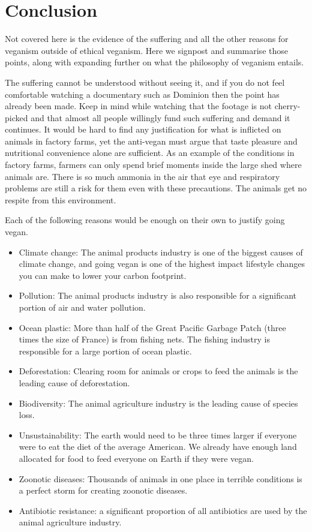 
\section{Conclusion}

Not covered here is the evidence of the suffering and all the other reasons for veganism outside of ethical veganism. Here we signpost and summarise those points, along with expanding further on what the philosophy of veganism entails.

The suffering cannot be understood without seeing it, and if you do not feel comfortable watching a documentary such as Dominion then the point has already been made. Keep in mind while watching that the footage is not cherry-picked and that almost all people willingly fund such suffering and demand it continues. It would be hard to find any justification for what is inflicted on animals in factory farms, yet the anti-vegan must argue that taste pleasure and nutritional convenience alone are sufficient. As an example of the conditions in factory farms, farmers can only spend brief moments inside the large shed where animals are. There is so much ammonia in the air that eye and respiratory problems are still a risk for them even with these precautions. The animals get no respite from this environment.

Each of the following reasons would be enough on their own to justify going vegan.

\begin{itemize}
	\item Climate change: The animal products industry is one of the biggest causes of climate change, and going vegan is one of the highest impact lifestyle changes you can make to lower your carbon footprint.
	\item Pollution: The animal products industry is also responsible for a significant portion of air and water pollution.
	\item Ocean plastic: More than half of the Great Pacific Garbage Patch (three times the size of France) is from fishing nets. The fishing industry is responsible for a large portion of ocean plastic.
	\item Deforestation: Clearing room for animals or crops to feed the animals is the leading cause of deforestation.
	\item Biodiversity: The animal agriculture industry is the leading cause of species loss.
	\item Unsustainability: The earth would need to be three times larger if everyone were to eat the diet of the average American. We already have enough land allocated for food to feed everyone on Earth if they were vegan.
	\item Zoonotic diseases: Thousands of animals in one place in terrible conditions is a perfect storm for creating zoonotic diseases.
	\item Antibiotic resistance: a significant proportion of all antibiotics are used by the animal agriculture industry.
\end{itemize}

